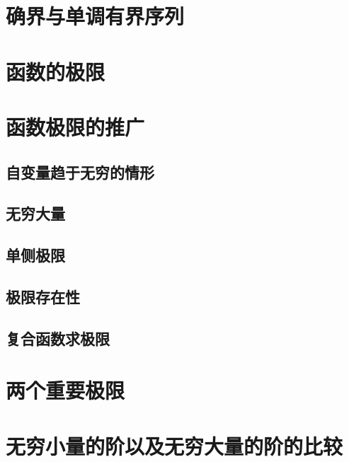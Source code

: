 \section{确界与单调有界序列}
\begin{exercise}
\item
\end{exercise}
\section{函数的极限}
\begin{exercise}
\item
\end{exercise}
\section{函数极限的推广}
\subsection{自变量趋于无穷的情形}
\subsection{无穷大量}
\subsection{单侧极限}
\subsection{极限存在性}
\subsection{复合函数求极限}
\begin{exercise}
\item
\end{exercise}
\section{两个重要极限}
\begin{exercise}
\item
\end{exercise}
\section{无穷小量的阶以及无穷大量的阶的比较}
\begin{exercise}
\item
\end{exercise}
